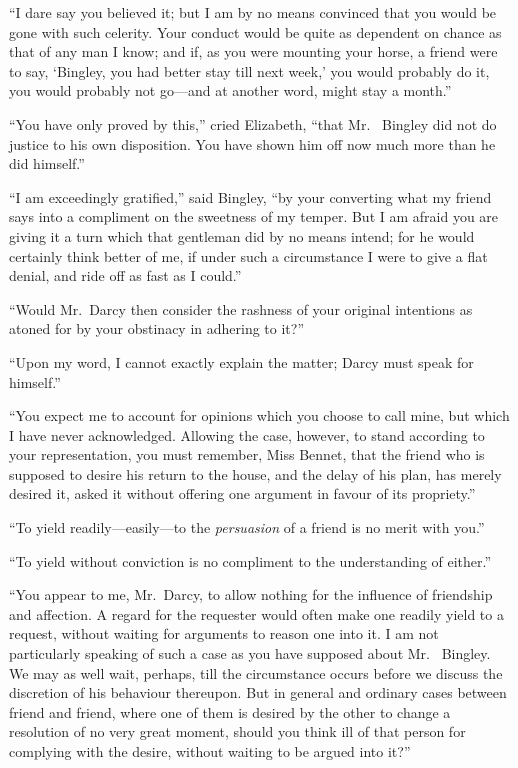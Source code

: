 ``I dare say you believed it; but I am by no means convinced that
you would be gone with such celerity.  Your conduct would be
quite as dependent on chance as that of any man I know; and if,
as you were mounting your horse, a friend were to say,  `Bingley,
you had better stay till next week,' you would probably do it,
you would probably not go---and at another word, might stay a
month.''

``You have only proved by this,'' cried Elizabeth, ``that Mr.\ %
Bingley did not do justice to his own disposition.  You have
shown him off now much more than he did himself.''

``I am exceedingly gratified,'' said Bingley, ``by your converting
what my friend says into a compliment on the sweetness of my
temper.  But I am afraid you are giving it a turn which that
gentleman did by no means intend; for he would certainly think
better of me, if under such a circumstance I were to give a flat
denial, and ride off as fast as I could.''

``Would Mr.\ Darcy then consider the rashness of your original
intentions as atoned for by your obstinacy in adhering to it?''

``Upon my word, I cannot exactly explain the matter; Darcy must
speak for himself.''

``You expect me to account for opinions which you choose to
call mine, but which I have never acknowledged.  Allowing the
case, however, to stand according to your representation, you
must remember, Miss Bennet, that the friend who is supposed to
desire his return to the house, and the delay of his plan, has
merely desired it, asked it without offering one argument in
favour of its propriety.''

``To yield readily---easily---to the \emph{persuasion} of a friend is
no merit with you.''

``To yield without conviction is no compliment to the understanding
of either.''

``You appear to me, Mr.\ Darcy, to allow nothing for the
influence of friendship and affection.  A regard for the requester
would often make one readily yield to a request, without waiting
for arguments to reason one into it.  I am not particularly
speaking of such a case as you have supposed about Mr.\ %
Bingley.  We may as well wait, perhaps, till the circumstance
occurs before we discuss the discretion of his behaviour
thereupon.  But in general and ordinary cases between friend and
friend, where one of them is desired by the other to change a
resolution of no very great moment, should you think ill of that
person for complying with the desire, without waiting to be
argued into it?''

